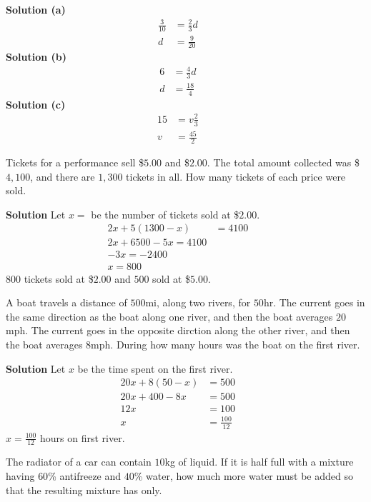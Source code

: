 \textbf{Solution (a)}
\begin{align*}
\frac{3}{10} &= \frac{2}{3} d && \\
d &= \frac{9}{20}
\end{align*}
\textbf{Solution (b)}
\begin{align*}
6 &= \frac{4}{3} d && \\
d &= \frac{18}{4}
\end{align*}
\textbf{Solution (c)}
\begin{align*}
15 &= v \frac{2}{3} && \\
v &= \frac{45}{2} &&
\end{align*}

\begin{tcolorbox}[title=Problem 13, breakable]
Tickets for a performance sell \$$5.00$ and \$$2.00$. The total amount collected was
\$$4,100$, and there are $1,300$ tickets in all. How many tickets of each price 
were sold.
\end{tcolorbox}

\textbf{Solution}
Let $x =$ be the number of tickets sold at \$$2.00$.
\begin{align*}
2x + 5(1300 - x) &= 4100 && \\
2x + 6500 - 5x = 4100 && \\
-3x = -2400 && \\
x = 800
\end{align*}
$800$ tickets sold at \$$2.00$ and $500$ sold at \$$5.00$.

\begin{tcolorbox}[title=Problem 16, breakable]
A boat travels a distance of $500$mi, along two rivers, for $50$hr. The current goes in 
the same direction as the boat along one river, and then the boat averages $20$mph. The 
current goes in the opposite dirction along the other river, and then the boat averages 
$8$mph. During how many hours was the boat on the first river.
\end{tcolorbox}

\textbf{Solution}
Let $x$ be the time spent on the first river.
\begin{align*}
20x + 8(50 - x) &= 500 && \\
20x + 400 - 8x &= 500 && \\
12x &= 100 && \\
x &= \frac{100}{12} 
\end{align*}
$x = \frac{100}{12}$ hours on first river.

\begin{tcolorbox}[title=Problem 18, breakable]
The radiator of a car can contain $10$kg of liquid. If it is half full with a mixture 
having $60$\%  antifreeze and $40$\% water, how much more water must be added so that the
resulting mixture has only.
\end{tcolorbox}

